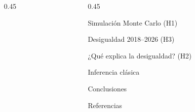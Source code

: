 \documentclass[final]{beamer}
\newcommand{\tabla}[1]{}
\newcommand{\tablaancha}[1]{\resizebox{\linewidth}{!}{\tabla{#1}}}
\begin{document}
\begin{frame}[t]
\begin{columns}[t]
\begin{column}{0.45\paperwidth}
    \end{column}

    \begin{column}{0.45\paperwidth}

      \begin{block}{Simulación Monte Carlo (H1)}
      \end{block}

      \begin{block}{Desigualdad 2018--2026 (H3)}
        \centering
        \tabla{theil_por_anio}
      \end{block}

      \begin{block}{¿Qué explica la desigualdad? (H2)}
        \centering
        \tabla{theil_participacion_entre}
      \end{block}

      \begin{block}{Inferencia clásica}
        \tablaancha{resumen_pruebas}
      \end{block}

      \begin{block}{Conclusiones}
      \end{block}

      \begin{block}{Referencias}
        \small
        \printbibliography[heading=none]
      \end{block}

    \end{column}

  \end{columns}

\end{frame}
\end{document}
